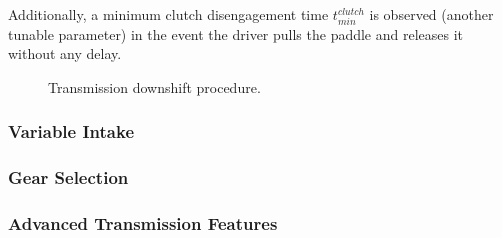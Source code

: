 Additionally, a minimum clutch disengagement time $t^{clutch}_{min}$ is observed (another tunable parameter) in the event the driver pulls the paddle and releases it without any delay.


\begin{figure}[H]
\centering

\caption{Transmission downshift procedure.}
\label{fig:transmission_downshift_flow}
\end{figure}

\subsubsection{Variable Intake}

\subsubsection{Gear Selection \label{sec:design_engine_transmission_gear_selection}}

\subsubsection{Advanced Transmission Features}

